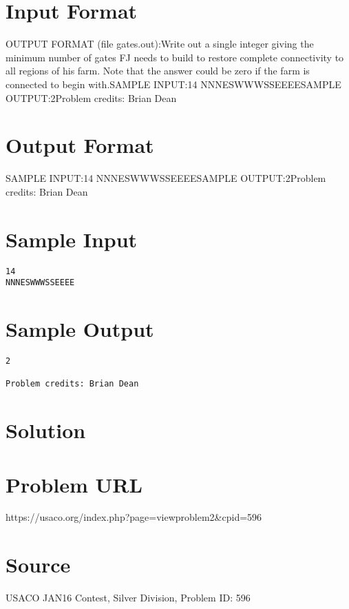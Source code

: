 \documentclass[12pt]{article}
\begin{document}
\section*{Input Format}
OUTPUT FORMAT (file gates.out):Write out a single integer giving the minimum number of gates FJ needs to build
to restore complete connectivity to all regions of his farm. Note that the
answer could be zero if the farm is connected to begin with.SAMPLE INPUT:14
NNNESWWWSSEEEESAMPLE OUTPUT:2Problem credits: Brian Dean

\section*{Output Format}
SAMPLE INPUT:14
NNNESWWWSSEEEESAMPLE OUTPUT:2Problem credits: Brian Dean

\section*{Sample Input}
\begin{verbatim}
14
NNNESWWWSSEEEE
\end{verbatim}

\section*{Sample Output}
\begin{verbatim}
2

Problem credits: Brian Dean
\end{verbatim}

\section*{Solution}


\section*{Problem URL}
https://usaco.org/index.php?page=viewproblem2&cpid=596

\section*{Source}
USACO JAN16 Contest, Silver Division, Problem ID: 596
\end{document}
